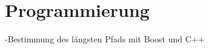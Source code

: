 \chapter{Programmierung}
\label{ch:Programmierung}

-Bestimmung des längsten Pfads mit Boost und C++